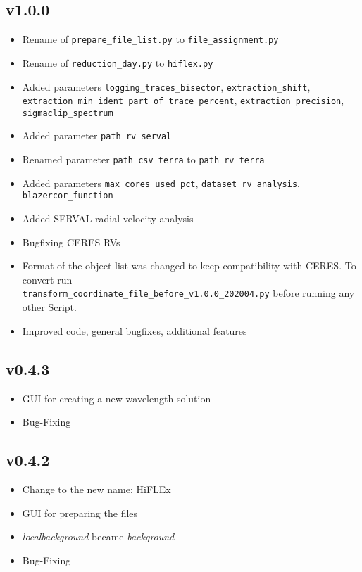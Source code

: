 \documentclass[10pt,a4paper]{article}
\begin{document}
\subsection*{v1.0.0}
\begin{itemize}\setlength\itemsep{0em}
  \item Rename of \verb|prepare_file_list.py| to \verb|file_assignment.py|
  \item Rename of \verb|reduction_day.py| to \verb|hiflex.py|
  \item Added parameters \verb|logging_traces_bisector|, \verb|extraction_shift|,\\ \verb|extraction_min_ident_part_of_trace_percent|, \verb|extraction_precision|, \verb|sigmaclip_spectrum|
  \item Added parameter \verb|path_rv_serval|
  \item Renamed parameter \verb|path_csv_terra| to \verb|path_rv_terra|
  \item Added parameters \verb|max_cores_used_pct|, \verb|dataset_rv_analysis|, \verb|blazercor_function|
  \item Added SERVAL radial velocity analysis
  \item Bugfixing CERES RVs
  \item Format of the object list was changed to keep compatibility with CERES. To convert run \\ \verb|transform_coordinate_file_before_v1.0.0_202004.py| before running any other Script. %
  \item Improved code, general bugfixes, additional features
\end{itemize}

\subsection*{v0.4.3}
\begin{itemize}\setlength\itemsep{0em}
  \item GUI for creating a new wavelength solution
  \item Bug-Fixing
\end{itemize}

\subsection*{v0.4.2}
\begin{itemize}\setlength\itemsep{0em}
  \item Change to the new name: HiFLEx
  \item GUI for preparing the files
  \item \textit{localbackground} became \textit{background}
  \item Bug-Fixing
\end{itemize}
\end{document}
